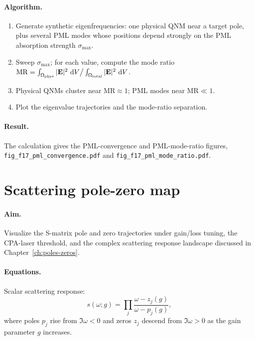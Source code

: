 \paragraph{Algorithm.}
\begin{enumerate}
 \item Generate synthetic eigenfrequencies: one physical QNM near
 a target pole, plus several PML modes whose positions depend
 strongly on the PML absorption strength $\sigma_{\max}$.
 \item Sweep $\sigma_{\max}$; for each value, compute the mode ratio
 $\mathrm{MR} = \int_{\Omega_{\mathrm{phys}}}|\mathbf{E}|^2\,\mathop{}\!\mathrm{d} V
 \big/ \int_{\Omega_{\mathrm{total}}}|\mathbf{E}|^2\,\mathop{}\!\mathrm{d} V$.
 \item Physical QNMs cluster near $\mathrm{MR} \approx 1$; PML modes
 near $\mathrm{MR} \ll 1$.
 \item Plot the eigenvalue trajectories and the mode-ratio
 separation.
\end{enumerate}

\paragraph{Result.}
The calculation gives the PML-convergence and PML-mode-ratio figures,
\texttt{fig\_f17\_pml\_convergence.pdf} and
\texttt{fig\_f17\_pml\_mode\_ratio.pdf}.


\section{Scattering pole-zero map}
\label{sec:recipe-pole-zero}

\paragraph{Aim.}
Visualize the S-matrix pole and zero trajectories under gain/loss
tuning, the CPA-laser threshold, and the complex scattering response
landscape discussed in Chapter~\ref{ch:poles-zeros}.

\paragraph{Equations.}
Scalar scattering response:
\begin{equation}
 s(\omega; g) = \prod_j \frac{\omega - z_j(g)}{\omega - p_j(g)},
 \label{eq:recipe-pole-zero}
\end{equation}
where poles $p_j$ rise from $\Im\omega < 0$ and zeros $z_j$ descend
from $\Im\omega > 0$ as the gain parameter $g$ increases.

